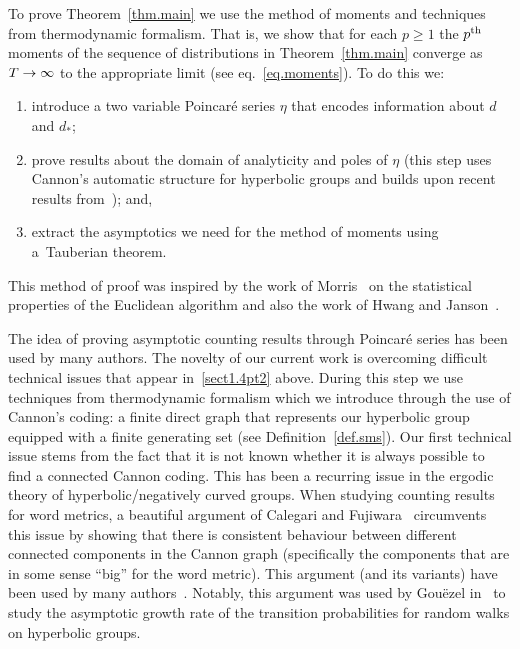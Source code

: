 \documentclass[AHL,Unicode,longabstracts,published]{cedram}
\renewcommand*{\to}{\mathchoice{\longrightarrow}{\rightarrow}{\rightarrow}{\rightarrow}}
\theoremstyle{plain}
\begin{document}
To prove Theorem~\ref{thm.main} we use the method of moments and techniques from thermodynamic formalism. That is, we show that for each $p\ge 1$ the $p^{\rm th}$ moments of the sequence of distributions in Theorem~\ref{thm.main} converge as $T\to\infty$ to the appropriate limit (see eq.~\eqref{eq.moments}). To do this we:%
\begin{enumerate}
\item\label{sect1.4pt1} introduce a two variable Poincaré series $\eta$ that encodes information about $d$ and $d_\ast$;
\item\label{sect1.4pt2} prove results about the domain of analyticity and poles of $\eta$ (this step uses Cannon's automatic structure for hyperbolic groups and builds upon recent results from~\cite{cantrell,cantrell.tanaka.2}); and, 
\item\label{sect1.4pt3} extract the asymptotics we need for the method of moments using a~{Tauberian theorem}.
\end{enumerate}
This method of proof was inspired by the work of Morris~\cite{Morris} on the statistical properties of the Euclidean algorithm and also the work of Hwang and Janson~\cite{hwang.janson}.

The idea of proving asymptotic counting results through Poincaré series has been used by many authors. The novelty of our current work is overcoming difficult technical issues that appear in~\eqref{sect1.4pt2} above. During this step we use techniques from thermodynamic formalism which we introduce through the use of Cannon's coding: a finite direct graph that represents our hyperbolic group equipped with a finite generating set (see Definition~\ref{def.sms}). Our first technical issue stems from the fact that it is not known whether it is always possible to find a connected Cannon coding. This has been a recurring issue in the ergodic theory of hyperbolic/negatively curved groups. When studying counting results for word metrics, a beautiful argument of Calegari and Fujiwara~\cite{CalegariFujiwara2010} circumvents this issue by showing that there is consistent behaviour between different connected components in the Cannon graph (specifically the components that are in some sense ``big'' for the word metric). This argument (and its variants) have been used by many authors~\cite{stats,cantrell.sert,GTT}. Notably, this argument was used by Gou\"ezel in~\cite{GouezelLocalLimit} to study the asymptotic growth rate of the transition probabilities for random walks on hyperbolic groups.
\end{document}

